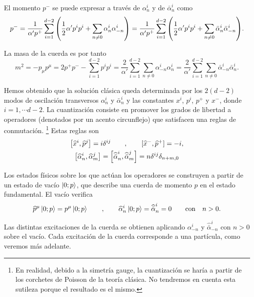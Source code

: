 El momento $p^-$ se puede expresar a través de $\alpha^i_n$ y de $\bar \alpha^i_n$ como
\begin{equation}
  p^- = \frac{1}{\alpha' p^+}\sum_{i=1}^{d-2} \qty(\frac{1}{2}\alpha'p^i p^i +\sum_{n\neq0}\alpha_n^i\alpha_{-n}^i) 
   = \frac{1}{\alpha' p^+}\sum_{i=1}^{d-2} \qty(\frac{1}{2}\alpha'p^i p^i +\sum_{n\neq0}\bar \alpha_n^i\bar \alpha_{-n}^i) .
\end{equation}

La masa de la cuerda es por tanto
\begin{equation}
  m^2=-p_\mu p^\mu = 2p^+p^- - \sum_{i=1}^{d-2} p^i p^i = 
  \frac{2}{\alpha'}\sum_{i=1}^{d-2} \sum_{n\neq 0} \alpha_{-n}^i \alpha_n^i
  =\frac{2}{\alpha'}\sum_{i=1}^{d-2} \sum_{n\neq 0}\bar \alpha_{-n}^i \bar\alpha_n^i.
  \label{eq:mass}
\end{equation}

Hemos obtenido que la solución clásica queda determinada por los $2(d-2)$ modos de oscilación transversos 
$\alpha^i_n$ y $\bar \alpha_n^i$ y las constantes $x^i$, $p^i$, $p^+$ y $x^-$, donde $i=1,\cdots d-2$.
La cuantización consiste en promover los grados de libertad a operadores (denotados
por un acento circunflejo) que satisfacen una reglas de conmutación.
\footnote{En realidad, debido a la simetría gauge, la cuantización se haría a partir de los
corchetes de Poisson de la teoría clásica. No tendremos en cuenta esta sutileza porque el
resultado es el mismo.}
Estas reglas son
\begin{equation}
  \begin{gathered}
    \qty[\widehat x^i,\widehat p^j] = i\delta^{ij}\qquad , \qquad [\widehat x^-,\widehat p^+] = -i,\\
    \qty[\widehat \alpha_n^i,\widehat \alpha_m^j]= \qty[\widehat {\bar \alpha}_n^i,\widehat {\bar \alpha}_m^j]= n \delta^{ij}\delta_{n+m,0}
  \end{gathered}
\end{equation}

Los estados físicos sobre los que actúan los operadores se construyen a partir de un estado 
de vacío $\ket{0;p}$, que describe una cuerda de momento $p$ en el estado fundamental.
El vacío verifica
\begin{equation}
  \widehat p^\mu \ket{0;p} = p^\mu \ket{0;p} \qquad, \qquad \widehat \alpha^i_n\ket{0;p}=\widehat {\bar\alpha}^i_n = 0 \qquad \text{con} \quad n>0.
\end{equation}

Las distintas excitaciones de la cuerda se obtienen aplicando $\alpha_{-n}^i$ y $\widehat{\bar\alpha}_{-n}^i$
con $n>0$ sobre el vacío.
Cada excitación de la cuerda corresponde a una partícula, como veremos más adelante.

